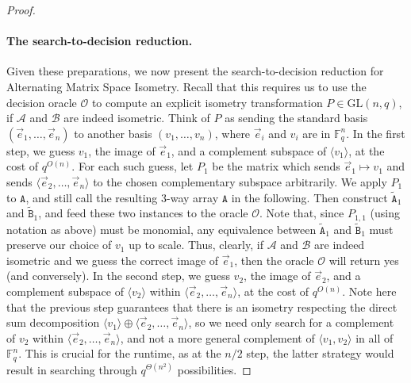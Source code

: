 \documentclass[10pt,a4paper]{article}
\begin{document}
\begin{proof}
\paragraph{The search-to-decision reduction.} Given these preparations, we now present the search-to-decision reduction for Alternating Matrix Space Isometry. Recall that this requires us to use the decision oracle $\mathcal O$ to compute an explicit isometry transformation $P\in\mathrm{GL}(n,q)$, if $\mathcal A$ and $\mathcal B$ are indeed isometric. Think of $P$ as sending the standard basis $(\vec e_1,\ldots,\vec e_n)$ to another basis $(v_1,\ldots,v_n)$, where $\vec e_i$ and $v_i$ are in $\mathbb F_q^n$.
In the first step, we guess $v_1$, the image of $\vec e_1$, and a complement subspace of $\langle v_1\rangle$, at the cost of $q^{O(n)}$. For each such guess, let $P_1$ be the matrix which sends $\vec e_1\mapsto v_1$ and sends $\langle\vec e_2,\ldots,\vec e_n\rangle$ to the chosen complementary subspace arbitrarily. We apply $P_1$ to $\mathtt A$, and still call the resulting 3-way array $\mathtt A$ in the following. Then construct $\widetilde{\mathtt A}_1$ and $\widetilde{\mathtt B}_1$, and feed these two instances to the oracle $\mathcal O$. Note that, since $P_{1,1}$ (using notation as above) must be monomial, any equivalence between $\widetilde{\mathtt A}_1$ and $\widetilde{\mathtt B}_1$ must preserve our choice of $v_1$ up to scale. Thus, clearly, if $\mathcal A$ and $\mathcal B$ are indeed isometric and we guess the correct image of $\vec e_1$, then the oracle $\mathcal O$ will return yes (and conversely).
In the second step, we guess $v_2$, the image of $\vec e_2$, and a complement subspace of $\langle v_2\rangle$ within $\langle\vec e_2,\ldots,\vec e_n\rangle$, at the cost of $q^{O(n)}$. Note here that the previous step guarantees that there is an isometry respecting the direct sum decomposition $\langle v_1\rangle\oplus\langle\vec e_2,\ldots,\vec e_n\rangle$, so we need only search for a complement of $v_2$ within $\langle\vec e_2,\ldots,\vec e_n\rangle$, and not a more general complement of $\langle v_1,v_2\rangle$ in all of $\mathbb F_q^n$. This is crucial for the runtime, as at the $n/2$ step, the latter strategy would result in searching through $q^{\Theta(n^2)}$ possibilities.

\end{proof}
\end{document}

